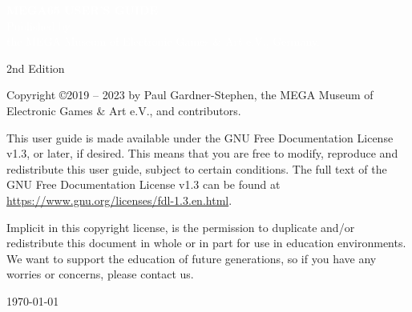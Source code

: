 %

\def\printmanual{true}
\def\printmanualbleed{true}

\hypersetup{colorlinks=false,linkcolor=black,urlcolor=black}
\newpage




\cleardoublepage


 \begin{titlepage}
 \pagecolor{blue}
 \begin{center}
 {
    \large
    \vspace*{2cm}
    {\Huge\textcolor{white}{\bf{MEGA65 USER'S GUIDE}}}\\
    \vspace{\fill}
    {\textcolor{white}
    {Published by \\ the MEGA Museum of Electronic Games \& Art e.V., Germany.}}
 }
 \end{center}
 \end{titlepage}

  \pagecolor{white}\textcolor{black}
  \vfill
  2nd Edition

  Copyright \copyright 2019 -- 2023 by Paul Gardner-Stephen,
  the MEGA Museum of Electronic Games \& Art e.V.,
  and contributors.

  This user guide is made available under the GNU Free Documentation
  License v1.3, or later, if desired. This means that you are free to
  modify, reproduce  and redistribute this user guide, subject to
  certain conditions. The full text of the GNU Free Documentation
  License v1.3 can be found at
  \url{https://www.gnu.org/licenses/fdl-1.3.en.html}.

  Implicit in this copyright license, is the permission to duplicate
  and/or redistribute this document in whole or in part for use in
  education environments. We want to support the education of future
  generations, so if you have any worries or concerns, please contact us.

   \par\today

\pagestyle{onlynumber}
\pagecolor{white}


